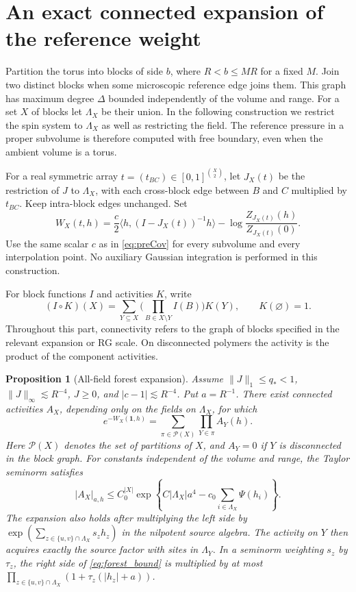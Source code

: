 \documentclass[11pt]{article}
\newtheorem{proposition}{Proposition}[section]
\begin{document}
\section{An exact connected expansion of the reference weight}\label{sec:box-forest}

Partition the torus into blocks of side \(b\), where \(R<b\le M R\)
for a fixed \(M\). Join two distinct blocks when some microscopic
reference edge joins them. This graph has maximum degree \(\Delta\)
bounded independently of the volume and range. For a set \(X\) of
blocks let \(\Lambda_X\) be their union. In the following construction
we restrict the spin system to \(\Lambda_X\) as well as restricting
the field. The reference pressure in a proper subvolume is therefore
computed with free boundary, even when the ambient volume is a torus.

For a real symmetric array \(t=(t_{BC})\in[0,1]^{\binom X2}\), let
\(J_X(t)\) be the restriction of \(J\) to \(\Lambda_X\), with each
cross-block edge between \(B\) and \(C\) multiplied by \(t_{BC}\).
Keep intra-block edges unchanged. Set
\[
 W_X(t,h)=\frac c2\langle h,(I-J_X(t))^{-1}h\rangle
       -\log\frac{Z_{J_X(t)}(h)}{Z_{J_X(t)}(0)}.
\]
Use the same scalar \(c\) as in \eqref{eq:preCov} for every subvolume
and every interpolation point. No auxiliary Gaussian integration
is performed in this construction.

For block functions \(I\) and activities \(K\), write
\[
 (I\circ K)(X)=\sum_{Y\subseteq X}
          \Big(\prod_{B\in X\setminus Y}I(B)\Big)K(Y),
 \qquad K(\varnothing)=1.
\]
Throughout this part, connectivity refers to the graph of blocks
specified in the relevant expansion or RG scale. On disconnected
polymers the activity is the product of the component activities.

\begin{proposition}[All-field forest expansion]\label{prop:forest}
Assume \(\|J\|_1\le q_*<1\), \(\|J\|_\infty\lesssim R^{-4}\),
\(J\ge0\), and \(|c-1|\lesssim R^{-4}\). Put \(a=R^{-1}\).
There exist connected activities \(A_X\), depending only on the
fields on \(\Lambda_X\), for which
\begin{equation}\label{eq:forest_partition}
 e^{-W_X(\boldsymbol 1,h)}=
       \sum_{\pi\in\mathcal P(X)}\prod_{Y\in\pi} A_Y(h).
\end{equation}
Here \(\mathcal P(X)\) denotes the set of partitions of \(X\), and \(A_Y=0\) if
\(Y\) is disconnected in the block graph. For constants independent
of the volume and range, the Taylor seminorm satisfies
\begin{equation}\label{eq:forest_bound}
 |A_X|_{a,h}\le C_0^{|X|}
 \exp\!\left\{C|\Lambda_X|a^4-c_0\sum_{i\in\Lambda_X}\Psi(h_i)\right\}.
\end{equation}
The expansion also holds after multiplying the left side by
\(\exp(\sum_{z\in\{u,v\}\cap\Lambda_X}s_z h_z)\) in the
nilpotent source algebra. The activity on \(Y\) then acquires exactly
the source factor with sites in \(\Lambda_Y\). In a seminorm weighting
\(s_z\) by \(\tau_z\), the right side of \eqref{eq:forest_bound}
is multiplied by at most
\(\prod_{z\in\{u,v\}\cap\Lambda_X}(1+\tau_z(|h_z|+a))\).
\end{proposition}
\end{document}

